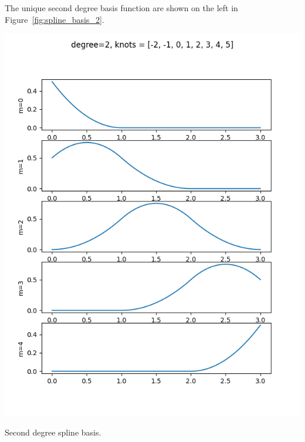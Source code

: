 The unique second degree basis function are shown on the left in Figure~\ref{fig:spline_basis_2}.
\begin{marginfigure}[-8in]
  	\includegraphics[width=\linewidth]{./chap5_trajectory_planning/figures/spline_basis_2}
  \caption{Second degree spline basis.}
  \label{fig:spline_basis_2}  
\end{marginfigure}
